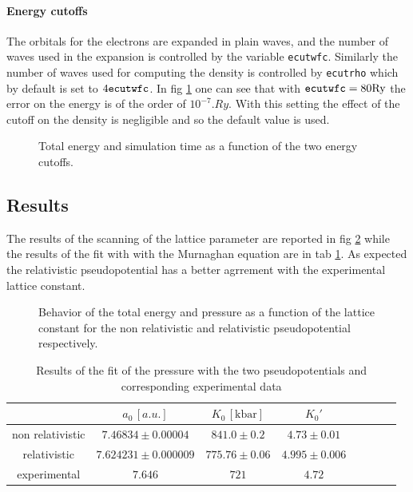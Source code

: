 \documentclass[a4paper, 11pt]{article}
\begin{document}
  \paragraph{Energy cutoffs}
    The orbitals for the electrons are expanded in plain waves, and the number of waves used in the expansion is controlled by the variable \verb|ecutwfc|. Similarly the number of waves used for computing the density is controlled by \verb|ecutrho| which by default is set to $4\verb|ecutwfc|$. In fig \ref{fig:bulk_ecut} one can see that with $ \verb|ecutwfc| = 80 \si{.Ry}$ the error on the energy is of the order of $10^{-7} \si{.Ry}$. With this setting the effect of the cutoff on the density is negligible and so the default value is used.

    \begin{figure}[H]
      \centering
      \caption{Total energy and simulation time as a function of the two energy cutoffs.}
      \label{fig:bulk_ecut}
    \end{figure}

  \subsection{Results}
    The results of the scanning of the lattice parameter are reported in fig \ref{fig:bulk_a} while the results of the fit with with the Murnaghan equation are in tab \ref{tab:bulk_a}. As expected the relativistic pseudopotential has a better agrrement with the experimental lattice constant.

  \begin{figure}
    \centering
    \caption{Behavior of the total energy and pressure as a function of the lattice constant for the non relativistic and relativistic pseudopotential respectively.}
    \label{fig:bulk_a}
  \end{figure}

  \begin{table}
    \centering
    \begin{tabular}{cccccccc}
      \toprule
        & $a_0\, [a.u.]$ & $K_0\, [\si{\kilo\bar}]$ & $K_0'$ \\
      \midrule
      non relativistic & $7.46834 \pm 0.00004$ & $841.0 \pm 0.2$ & $4.73 \pm 0.01$ \\
      relativistic & $7.624231 \pm 0.000009$ & $775.76 \pm 0.06$ & $4.995 \pm 0.006$ \\
      \midrule
      experimental \cite{rif:bulk_exp_data} & $7.646$ & $721$ & $4.72$ \\
      \bottomrule
    \end{tabular}
    \caption{Results of the fit of the pressure with the two pseudopotentials and corresponding experimental data}
    \label{tab:bulk_a}
  \end{table}
\end{document}
